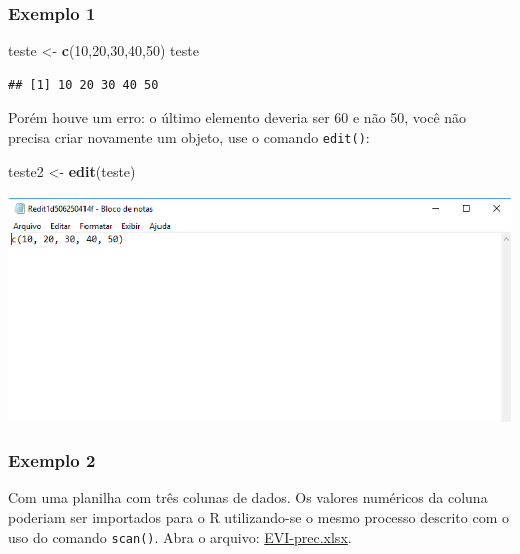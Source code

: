 \documentclass[
]{book}
\newenvironment{Shaded}{\begin{snugshade}}{\end{snugshade}}
\newcommand{\DecValTok}[1]{\textcolor[rgb]{0.00,0.00,0.81}{#1}}
\newcommand{\KeywordTok}[1]{\textcolor[rgb]{0.13,0.29,0.53}{\textbf{#1}}}
\newcommand{\NormalTok}[1]{#1}
\newcommand{\StringTok}[1]{\textcolor[rgb]{0.31,0.60,0.02}{#1}}
\begin{document}
\hypertarget{exemplo-1}{%
\subsubsection{Exemplo 1}\label{exemplo-1}}

\begin{Shaded}
\begin{Highlighting}[]
\NormalTok{teste <-}\StringTok{ }\KeywordTok{c}\NormalTok{(}\DecValTok{10}\NormalTok{,}\DecValTok{20}\NormalTok{,}\DecValTok{30}\NormalTok{,}\DecValTok{40}\NormalTok{,}\DecValTok{50}\NormalTok{)}
\NormalTok{teste}
\end{Highlighting}
\end{Shaded}

\begin{verbatim}
## [1] 10 20 30 40 50
\end{verbatim}

Porém houve um erro: o último elemento deveria ser 60 e não 50, você não precisa criar novamente um objeto, use o comando \texttt{edit()}:

\begin{Shaded}
\begin{Highlighting}[]
\NormalTok{teste2 <-}\StringTok{ }\KeywordTok{edit}\NormalTok{(teste)}
\end{Highlighting}
\end{Shaded}

\includegraphics[width=10.54in]{image/edit2}

\hypertarget{exemplo-2}{%
\subsubsection{Exemplo 2}\label{exemplo-2}}

Com uma planilha com três colunas de dados. Os valores numéricos da coluna poderiam ser importados para o R utilizando-se o mesmo processo descrito com o uso do comando \texttt{scan()}. Abra o arquivo: \href{https://www.dropbox.com/s/6504oo4olw34dw9/EVI_Prec.xlsx?dl=1}{EVI-prec.xlsx}.
\end{document}
